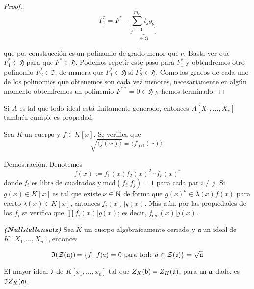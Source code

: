 \documentclass[./main.tex]{subfiles}
\begin{document}
\begin{proof}
\[F^{*}_1 = F^* - \underset{\in \mathfrak{H}}{\underbrace{\sum_{j=1}^{m_\nu} t_j g_{\nu_j}}} \]

que por construcción es un polinomio de grado menor que $\nu$. Basta ver que $F^{*}_1 \in \mathfrak{H}$ para que $F^*\in \mathfrak{H}$. Podemos repetir este paso para $F^{*}_1$ y obtendremos otro polinomio $F^*_2\in \mathfrak I$, de manera que $F^*_1\in \mathfrak{H}$ si $F^*_2 \in \mathfrak H$. Como los grados de cada uno de los polinomios que obtenemos son cada vez menores, necesariamente en algún momento obtendremos un polinomio $F^{**} = 0 \in \mathfrak H$ y hemos terminado.


\end{proof}

\begin{corollary}
Si $A$ es tal que todo ideal está finitamente generado, entonces $A[X_1,\dots, X_n]$ también cumple es propiedad.
\end{corollary}

\begin{lemma} Sea $K$ un cuerpo y $f\in K[x]$. Se verifica que$$\sqrt{\langle f(x)\rangle}=\langle f_{\text{red}}(x)\rangle.$$
\end{lemma}
Demostración. Denotemos$$f(x):=f_1(x)f_2(x)^2\cdots f_r(x)^r$$donde $f_i$ es libre de cuadrados y $\text{mcd}(f_i,f_j)=1$ para cada par $i\neq j$. Si $g(x)\in K[x]$ es tal que existe $\nu\in\mathbb{N}$ de forma que $g(x)^\nu\in\lambda(x)f(x)$ para cierto $\lambda(x)\in K[x]$, entonces $f_i(x)|g(x)$. Más aún, por las propiedades de los $f_i$ se verifica que $\prod f_i(x)|g(x)$; es decir, $f_\text{red}(x)|g(x)$.

\begin{theorem} \textbf{\emph{(Nullstellensatz)}}
Sea $K$ un cuerpo algebraicamente cerrado y $\mathfrak a$ un ideal de $K[X_1,\dots,X_n]$, entonces

\[\mathfrak I (\mathcal{Z}(\mathfrak a)) = \{ f\big \vert \; f(a) = 0 \text{ para todo } a \in\mathcal{Z}(\mathfrak a) \} = \sqrt{\mathfrak a}\]
\end{theorem}

\begin{corollary}
 El mayor ideal $\mathfrak{b}$ de $K[x_1,\dots,x_n]$ tal que $Z_K(\mathfrak{b})=Z_K(\mathfrak{a})$, para un $\mathfrak{a}$ dado, es $\mathfrak{I}Z_K(\mathfrak{a})$.
\end{corollary}
\end{document}

